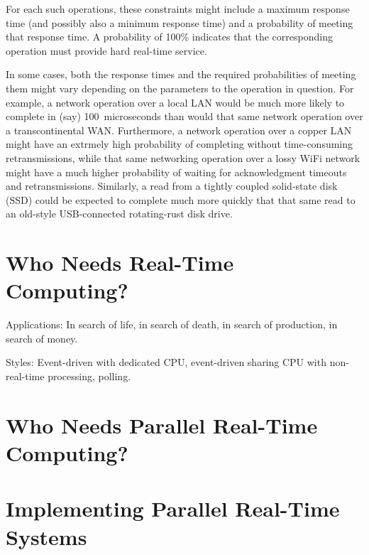 For each such operations, these constraints might include a maximum
response time (and possibly also a minimum response time) and a
probability of meeting that response time.
A probability of 100\% indicates that the corresponding operation
must provide hard real-time service.

In some cases, both the response times and the required probabilities of
meeting them might vary depending on the parameters to the operation in
question.
For example, a network operation over a local LAN would be much more likely
to complete in (say) 100~microseconds than would that same network operation
over a transcontinental WAN.
Furthermore, a network operation over a copper LAN might have an extrmely
high probability of completing without time-consuming retransmissions,
while that same networking operation over a lossy WiFi network might
have a much higher probability of waiting for acknowledgment
timeouts and retransmissions.
Similarly, a read from a tightly coupled solid-state disk (SSD) could be
expected to complete much more quickly that that same read to an old-style
USB-connected rotating-rust disk drive.

\section{Who Needs Real-Time Computing?}
\label{sec:rt:Who Needs Real-Time Computing?}

Applications:  In search of life, in search of death, in search of
production, in search of money.

Styles: Event-driven with dedicated CPU, event-driven sharing CPU with
non-real-time processing, polling.

\section{Who Needs Parallel Real-Time Computing?}
\label{sec:rt:Who Needs Parallel Real-Time Computing?}

\section{Implementing Parallel Real-Time Systems}
\label{sec:rt:Implementing Parallel Real-Time Systems}

